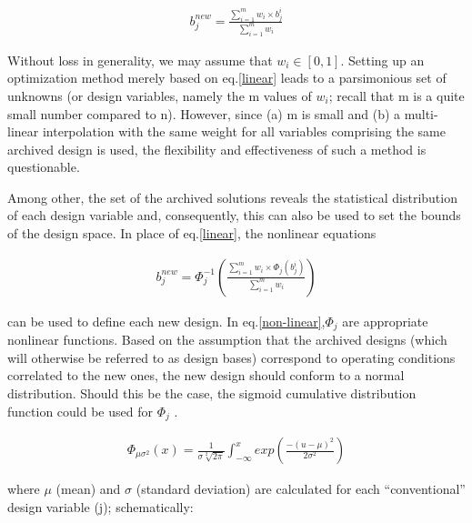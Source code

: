 \begin{eqnarray}
   b_j^{new} = \frac{\sum_{i=1}^{m}w_i \times b_j^i}{\sum_{i=1}^{m}w_i } 
   \label{linear} 
\end{eqnarray}

Without loss in generality, we may assume that $w_i \in [0,1]$. Setting up an optimization method merely based on eq.\ref{linear} leads to a parsimonious set of unknowns (or design variables, namely the m values of $w_i$; recall that m is a quite small number compared to n). However, since (a) m is small and (b) a multi-linear interpolation with the same weight for all variables comprising the same archived design is used, the flexibility and effectiveness of such a method is questionable. 

Among other, the set of the archived solutions reveals the statistical distribution of each design variable and, consequently, this can also be used to set the bounds of the design space. In place of eq.\ref{linear}, the nonlinear equations

\begin{eqnarray}
   b_j^{new} = \Phi _j^{-1} (\frac{\sum_{i=1}^{m}w_i \times \Phi _j(b_j^i)}{\sum_{i=1}^{m}w_i }) 
   \label{non-linear} 
\end{eqnarray}

can be used to define each new design. In eq.\ref{non-linear},$\Phi _j$ are appropriate nonlinear functions. Based on the assumption that the archived designs (which will otherwise be referred to as design bases) correspond to operating conditions correlated to the new ones, the new design should conform to a normal distribution. Should this be the case, the sigmoid cumulative distribution function could be used for $\Phi _j$  \cite{Kiemele}. 

\begin{eqnarray}
   \Phi _{\mu \sigma ^2} (x)= \frac{1}{\sigma\sqrt[2]{2\pi}}\int _{-\infty}^x exp(\frac{-(u-\mu)^2}{2 \sigma^2}) 
   \label{cdf} 
\end{eqnarray}

where $\mu$ (mean) and $\sigma$ (standard deviation) are calculated for each “conventional” design variable (j); schematically:

